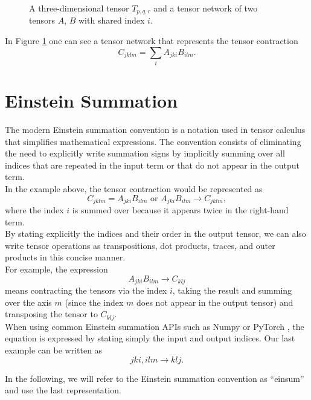 \begin{figure}
\begin{center}
\caption{A three-dimensional tensor $T_{p,q,r}$ and a tensor network of two tensors $A$, $B$ with shared index $i$.}
\label{fig:tensor_network}
\end{center}
\end{figure}

\noindent In Figure \ref{fig:tensor_network} one can see a tensor network that represents the tensor contraction 
$$
C_{jklm} = \sum_{i} A_{jki} B_{ilm}.
$$

\section{Einstein Summation}
The modern Einstein summation convention is a notation used in tensor calculus that simplifies mathematical expressions. The convention consists of eliminating the need to explicitly write summation signs by implicitly summing over all indices that are repeated in the input term or that do not appear in the output term.\\
In the example above, the tensor contraction would be represented as
$$C_{jklm} = A_{jki} B_{ilm} \text{ or }A_{jki} B_{ilm} \rightarrow C_{jklm},$$
\noindent where the index $i$ is summed over because it appears twice in the right-hand term.\\
By stating explicitly the indices and their order in the output tensor, we can also write tensor operations as transpositions, dot products, traces, and outer products in this concise manner. \\
For example, the expression
$$A_{jki} B_{ilm} \rightarrow C_{klj}$$
means contracting the tensors via the index $i$, taking the result and summing over the axis $m$ (since the index $m$ does not appear in the output tensor) and transposing the tensor to $ C_{klj}$. \\

\noindent When using common Einstein summation APIs such as Numpy \cite{Numpy} or PyTorch \cite{PyTorch}, the equation is expressed by stating simply the input and output indices. Our last example can be written as 
$$jki, ilm \rightarrow klj.$$

\noindent In the following, we will refer to the Einstein summation convention as ``einsum'' and use the last representation. 
